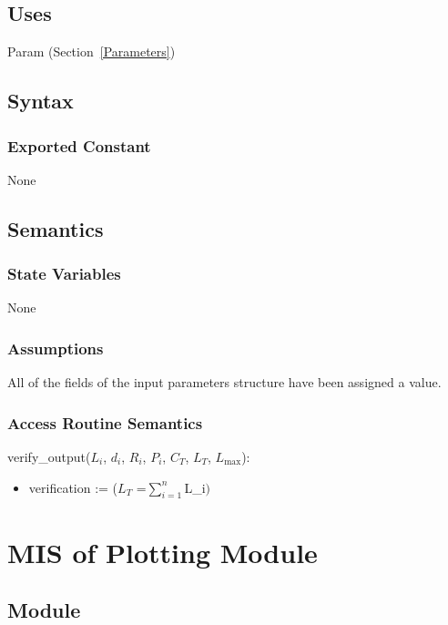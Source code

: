 \documentclass[12pt, titlepage]{article}
\begin{document}
\subsection{Uses}

Param (Section~\ref{Parameters})

\subsection{Syntax}

\subsubsection{Exported Constant}

None



\subsection{Semantics}

\subsubsection{State Variables}

None

\subsubsection{Assumptions}

All of the fields of the input parameters structure have been assigned a
value.  

\subsubsection{Access Routine Semantics}

\noindent verify\_output($L_i$, $d_i$, $R_i$, $P_i$, $C_T$, $L_T$, $L_\text{max}$):
\begin{itemize}
\item verification := ($L_T$ =$\sum_{i=1}^{n} $L_i$)$
\end{itemize}


\newpage
\section{MIS of Plotting Module} \label{Plot}

\subsection{Module}
\end{document}
